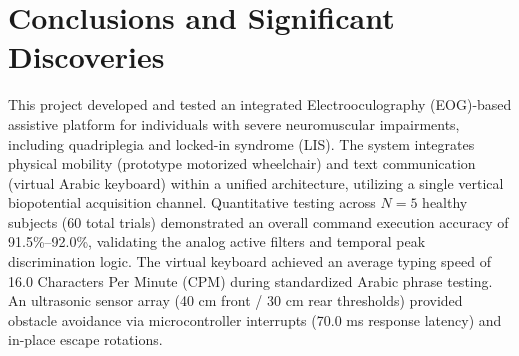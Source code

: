 \section{Conclusions and Significant Discoveries}
\label{sec:conclusions_discoveries}

This project developed and tested an integrated Electrooculography (EOG)-based assistive platform for individuals with severe neuromuscular impairments, including quadriplegia and locked-in syndrome (LIS). The system integrates physical mobility (prototype motorized wheelchair) and text communication (virtual Arabic keyboard) within a unified architecture, utilizing a single vertical biopotential acquisition channel. Quantitative testing across $N = 5$ healthy subjects (60 total trials) demonstrated an overall command execution accuracy of 91.5\%--92.0\%, validating the analog active filters and temporal peak discrimination logic. The virtual keyboard achieved an average typing speed of 16.0 Characters Per Minute (CPM) during standardized Arabic phrase testing. An ultrasonic sensor array (40 cm front / 30 cm rear thresholds) provided obstacle avoidance via microcontroller interrupts (70.0 ms response latency) and in-place escape rotations.

